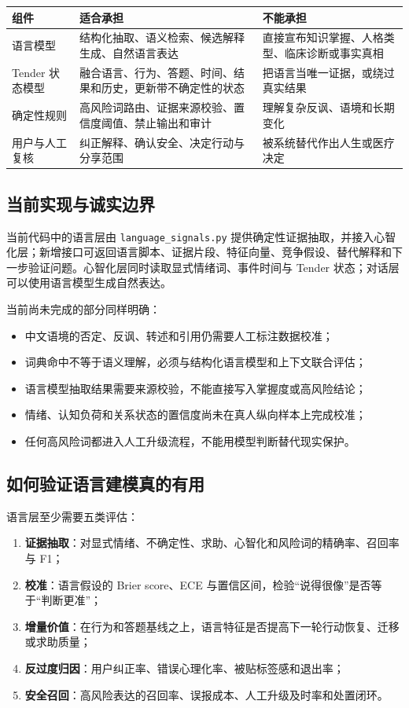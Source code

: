 \documentclass[UTF8,a4paper,11pt]{ctexart}
\begin{document}
\begin{center}
\begin{longtable}{@{}p{3.1cm}p{5.5cm}p{4.5cm}@{}}
\toprule
\textbf{组件} & \textbf{适合承担} & \textbf{不能承担} \\
\midrule
语言模型 & 结构化抽取、语义检索、候选解释生成、自然语言表达 & 直接宣布知识掌握、人格类型、临床诊断或事实真相 \\
Tender 状态模型 & 融合语言、行为、答题、时间、结果和历史，更新带不确定性的状态 & 把语言当唯一证据，或绕过真实结果 \\
确定性规则 & 高风险词路由、证据来源校验、置信度阈值、禁止输出和审计 & 理解复杂反讽、语境和长期变化 \\
用户与人工复核 & 纠正解释、确认安全、决定行动与分享范围 & 被系统替代作出人生或医疗决定 \\
\bottomrule
\end{longtable}
\end{center}

\subsection{当前实现与诚实边界}

当前代码中的语言层由 \texttt{language\_signals.py} 提供确定性证据抽取，并接入心智化层；新增接口可返回语言脚本、证据片段、特征向量、竞争假设、替代解释和下一步验证问题。心智化层同时读取显式情绪词、事件时间与 Tender 状态；对话层可以使用语言模型生成自然表达。

当前尚未完成的部分同样明确：

\begin{itemize}
\item 中文语境的否定、反讽、转述和引用仍需要人工标注数据校准；
\item 词典命中不等于语义理解，必须与结构化语言模型和上下文联合评估；
\item 语言模型抽取结果需要来源校验，不能直接写入掌握度或高风险结论；
\item 情绪、认知负荷和关系状态的置信度尚未在真人纵向样本上完成校准；
\item 任何高风险词都进入人工升级流程，不能用模型判断替代现实保护。
\end{itemize}

\subsection{如何验证语言建模真的有用}

语言层至少需要五类评估：

\begin{enumerate}
\item \textbf{证据抽取}：对显式情绪、不确定性、求助、心智化和风险词的精确率、召回率与 F1；
\item \textbf{校准}：语言假设的 Brier score、ECE 与置信区间，检验“说得很像”是否等于“判断更准”；
\item \textbf{增量价值}：在行为和答题基线之上，语言特征是否提高下一轮行动恢复、迁移或求助质量；
\item \textbf{反过度归因}：用户纠正率、错误心理化率、被贴标签感和退出率；
\item \textbf{安全召回}：高风险表达的召回率、误报成本、人工升级及时率和处置闭环。
\end{enumerate}
\end{document}
